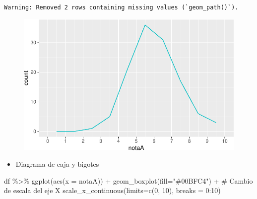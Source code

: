 \documentclass[
  a4paper,
]{scrreport}
\newenvironment{Shaded}{\begin{snugshade}}{\end{snugshade}}
\newcommand{\AttributeTok}[1]{\textcolor[rgb]{0.40,0.45,0.13}{#1}}
\newcommand{\CommentTok}[1]{\textcolor[rgb]{0.37,0.37,0.37}{#1}}
\newcommand{\DecValTok}[1]{\textcolor[rgb]{0.68,0.00,0.00}{#1}}
\newcommand{\FunctionTok}[1]{\textcolor[rgb]{0.28,0.35,0.67}{#1}}
\newcommand{\NormalTok}[1]{\textcolor[rgb]{0.00,0.23,0.31}{#1}}
\newcommand{\SpecialCharTok}[1]{\textcolor[rgb]{0.37,0.37,0.37}{#1}}
\newcommand{\StringTok}[1]{\textcolor[rgb]{0.13,0.47,0.30}{#1}}
\providecommand{\tightlist}{%
  \setlength{\itemsep}{0pt}\setlength{\parskip}{0pt}}\usepackage{longtable,booktabs,array}
\theoremstyle{definition}
\theoremstyle{definition}
\theoremstyle{remark}
\begin{document}
\begin{verbatim}
Warning: Removed 2 rows containing missing values (`geom_path()`).
\end{verbatim}

\begin{figure}[H]

{\centering \includegraphics{./08-analisis-estadisticos_files/figure-pdf/unnamed-chunk-14-1.pdf}

}

\end{figure}

\begin{itemize}
\tightlist
\item
  Diagrama de caja y bigotes
\end{itemize}

\begin{Shaded}
\begin{Highlighting}[]
\NormalTok{df }\SpecialCharTok{\%\textgreater{}\%} \FunctionTok{ggplot}\NormalTok{(}\FunctionTok{aes}\NormalTok{(}\AttributeTok{x =}\NormalTok{ notaA)) }\SpecialCharTok{+} 
  \FunctionTok{geom\_boxplot}\NormalTok{(}\AttributeTok{fill=}\StringTok{"\#00BFC4"}\NormalTok{) }\SpecialCharTok{+}
  \CommentTok{\# Cambio de escala del eje X}
  \FunctionTok{scale\_x\_continuous}\NormalTok{(}\AttributeTok{limits=}\FunctionTok{c}\NormalTok{(}\DecValTok{0}\NormalTok{, }\DecValTok{10}\NormalTok{), }\AttributeTok{breaks =} \DecValTok{0}\SpecialCharTok{:}\DecValTok{10}\NormalTok{)}
\end{Highlighting}
\end{Shaded}
\end{document}
